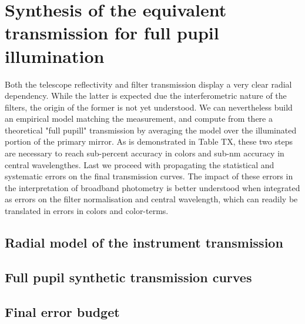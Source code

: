 \section{Synthesis of the equivalent transmission for full pupil illumination}
\label{sec:discussion}

Both the telescope reflectivity and filter transmission display a very clear radial dependency. While the latter is expected due the interferometric nature of the filters, the origin of the former is not yet understood. We can nevertheless build an empirical model matching the measurement, and compute from there a theoretical "full pupill" transmission by averaging the model over the illuminated portion of the primary mirror. As is demonstrated in Table TX, these two steps are necessary to reach sub-percent accuracy in colors and sub-nm accuracy in central wavelengthes. Last we proceed with propagating the statistical and systematic errors on the final transmission curves. The impact of these errors in the interpretation of broadband photometry is better understood when integrated as errors on the filter normalisation and central wavelength, which can readily be translated in errors in colors and color-terms.


\subsection{Radial model of the instrument transmission}\label{sec:model}

\subsection{Full pupil synthetic transmission curves}

\subsection{Final error budget}


